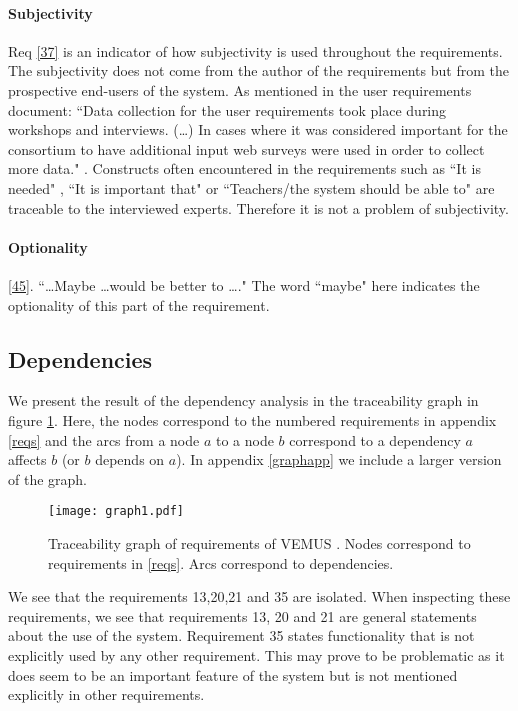 \documentclass[a4paper,twoside, twocolumn,11pt]{article}
\numberwithin{equation}{section}
\begin{document}
\paragraph{Subjectivity}
Req \ref{37} is an indicator of how subjectivity is used throughout the requirements. The subjectivity does not come from the author of the requirements but from the prospective end-users of the system. As mentioned in the user requirements document: ``Data collection for the user requirements took place during workshops and interviews. (\ldots) In cases where it was considered important for the consortium to have additional input web surveys were used in order to collect more data." \cite{VEMUS}. Constructs often encountered in the requirements such as ``It is needed" , ``It is important that" or ``Teachers/the system should be able to" are traceable to the interviewed experts. Therefore it is not a problem of subjectivity.

\paragraph{Optionality}
\ref{45}. ``\ldots Maybe \ldots would be better to \ldots." The word ``maybe" here indicates the optionality of this part of the requirement.

\subsection{Dependencies}
We present the result of the dependency analysis in the traceability graph in figure \ref{fig:graph}. Here, the nodes correspond to the numbered requirements in appendix \ref{reqs} and the arcs from a node $a$ to a node $b$ correspond to a dependency $a$ affects $b$ (or $b$ depends on $a$). In appendix \ref{graphapp} we include a larger version of the graph.

\begin{figure}
\center
\texttt{[image: graph1.pdf]}
\caption{Traceability graph of requirements of VEMUS \cite{VEMUS}. Nodes correspond to requirements in \ref{reqs}. Arcs correspond to dependencies.}
\label{fig:graph}
\end{figure}

We see that the requirements 13,20,21 and 35 are isolated. When inspecting these requirements, we see that requirements 13, 20 and 21 are general statements about the use of the system. 
Requirement 35 states functionality that is not explicitly used by any other requirement. This may prove to be problematic as it does seem to be an important feature of the system but is not mentioned explicitly in other requirements.
\end{document}
